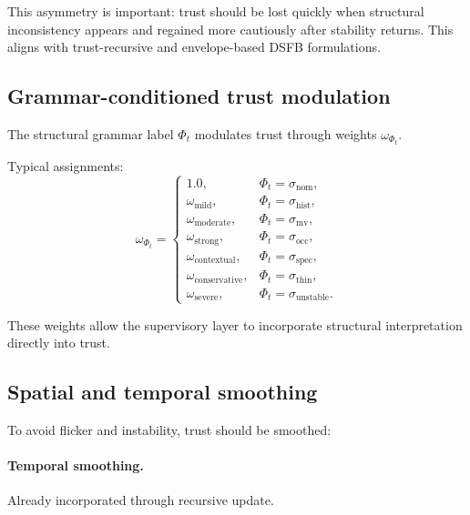 \documentclass[11pt,letterpaper]{article}
\theoremstyle{gcresult}
\theoremstyle{definition}
\begin{document}
This asymmetry is important: trust should be lost quickly when structural inconsistency appears and regained more cautiously after stability returns. This aligns with trust-recursive and envelope-based DSFB formulations. 


\subsection{Grammar-conditioned trust modulation}

The structural grammar label $\Phi_t$ modulates trust through weights $\omega_{\Phi_t}$.

Typical assignments:
\begin{equation}
\omega_{\Phi_t}=
\begin{cases}
1.0, & \Phi_t=\sigma_{\mathrm{nom}},\\
\omega_{\mathrm{mild}}, & \Phi_t=\sigma_{\mathrm{hist}},\\
\omega_{\mathrm{moderate}}, & \Phi_t=\sigma_{\mathrm{mv}},\\
\omega_{\mathrm{strong}}, & \Phi_t=\sigma_{\mathrm{occ}},\\
\omega_{\mathrm{contextual}}, & \Phi_t=\sigma_{\mathrm{spec}},\\
\omega_{\mathrm{conservative}}, & \Phi_t=\sigma_{\mathrm{thin}},\\
\omega_{\mathrm{severe}}, & \Phi_t=\sigma_{\mathrm{unstable}}.
\end{cases}
\end{equation}

These weights allow the supervisory layer to incorporate structural interpretation directly into trust.


\subsection{Spatial and temporal smoothing}

To avoid flicker and instability, trust should be smoothed:

\paragraph{Temporal smoothing.}
Already incorporated through recursive update.
\end{document}
